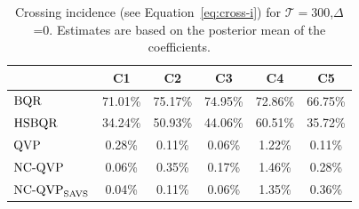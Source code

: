 \begin{table}[]
\centering
\begin{tabular}{l|ccccc}
   & C1 & C2 & C3 & C4 & C5 \\ \hline
$\operatorname{BQR}$ & 71.01\% & 75.17\% & 74.95\% & 72.86\% & 66.75\% \\
$\operatorname{HSBQR}$ & 34.24\% & 50.93\% & 44.06\% & 60.51\% & 35.72\% \\ \hdashline
$\operatorname{QVP}$ & 0.28\% & 0.11\% & 0.06\% & 1.22\% & 0.11\% \\
$\operatorname{NC-QVP}$ & 0.06\% & 0.35\% & 0.17\% & 1.46\% & 0.28\% \\
$\operatorname{NC-QVP}_{\mathrm{SAVS}}$ & 0.04\% & 0.11\% & 0.06\% & 1.35\% & 0.36\% \\ \hline
\end{tabular}%
\caption{Crossing incidence (see Equation~\ref{eq:cross-i}) for $\mathcal{T}=300$,$\varDelta$=0. Estimates are based on the posterior mean of the coefficients.}
\label{tab:cross}
\end{table}



